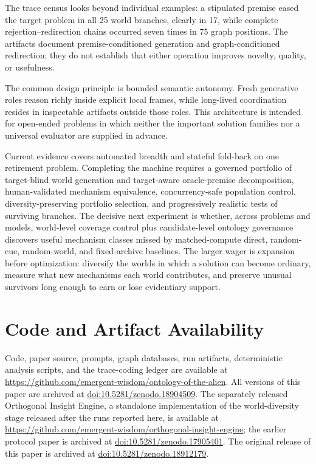 \documentclass[11pt,a4paper]{article}
\begin{document}
The trace census looks beyond individual examples: a stipulated premise eased the target problem in all 25 world branches, clearly in 17, while complete rejection--redirection chains occurred seven times in 75 graph positions. The artifacts document premise-conditioned generation and graph-conditioned redirection; they do not establish that either operation improves novelty, quality, or usefulness.

The common design principle is bounded semantic autonomy. Fresh generative roles reason richly inside explicit local frames, while long-lived coordination resides in inspectable artifacts outside those roles. This architecture is intended for open-ended problems in which neither the important solution families nor a universal evaluator are supplied in advance.

Current evidence covers automated breadth and stateful fold-back on one retirement problem. Completing the machine requires a governed portfolio of target-blind world generation and target-aware oracle-premise decomposition, human-validated mechanism equivalence, concurrency-safe population control, diversity-preserving portfolio selection, and progressively realistic tests of surviving branches. The decisive next experiment is whether, across problems and models, world-level coverage control plus candidate-level ontology governance discovers useful mechanism classes missed by matched-compute direct, random-cue, random-world, and fixed-archive baselines. The larger wager is expansion before optimization: diversify the worlds in which a solution can become ordinary, measure what new mechanisms each world contributes, and preserve unusual survivors long enough to earn or lose evidentiary support.

\section*{Code and Artifact Availability}

Code, paper source, prompts, graph databases, run artifacts, deterministic analysis scripts, and the trace-coding ledger are available at \url{https://github.com/emergent-wisdom/ontology-of-the-alien}. All versions of this paper are archived at \href{https://doi.org/10.5281/zenodo.18904509}{doi:10.5281/zenodo.18904509}. The separately released Orthogonal Insight Engine, a standalone implementation of the world-diversity stage released after the runs reported here, is available at \url{https://github.com/emergent-wisdom/orthogonal-insight-engine}; the earlier protocol paper is archived at \href{https://doi.org/10.5281/zenodo.17905401}{doi:10.5281/zenodo.17905401}. The original release of this paper is archived at \href{https://doi.org/10.5281/zenodo.18912179}{doi:10.5281/zenodo.18912179}.
\end{document}
